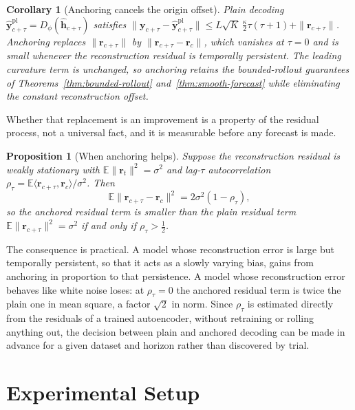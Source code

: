 \documentclass[a4paper,fleqn]{cas-sc}
\newtheorem{proposition}{Proposition}
\newtheorem{corollary}{Corollary}
\newcommand{\h}{\mathbf{h}}
\newcommand{\y}{\mathbf{y}}
\begin{document}
\begin{corollary}[Anchoring cancels the origin offset]
\label{cor:anchor}
Plain decoding $\hat{\y}^{\mathrm{pl}}_{c+\tau}=D_\phi(\hat{\h}_{c+\tau})$ satisfies
$\|\y_{c+\tau}-\hat{\y}^{\mathrm{pl}}_{c+\tau}\|\le
L\sqrt{K}\,\tfrac{\kappa}{2}\tau(\tau+1)+\|\mathbf{r}_{c+\tau}\|$. Anchoring replaces
$\|\mathbf{r}_{c+\tau}\|$ by $\|\mathbf{r}_{c+\tau}-\mathbf{r}_c\|$, which vanishes at
$\tau=0$ and is small whenever the reconstruction residual is temporally
persistent. The leading curvature term is unchanged, so anchoring retains the
bounded-rollout guarantees of Theorems~\ref{thm:bounded-rollout}
and~\ref{thm:smooth-forecast} while eliminating the constant reconstruction
offset.
\end{corollary}

Whether that replacement is an improvement is a property of the residual
process, not a universal fact, and it is measurable before any forecast is
made.

\begin{proposition}[When anchoring helps]
\label{prop:anchor-gain}
Suppose the reconstruction residual is weakly stationary with
$\mathbb{E}\|\mathbf{r}_t\|^2=\sigma^2$ and lag-$\tau$ autocorrelation
$\rho_\tau=\mathbb{E}\langle\mathbf{r}_{c+\tau},\mathbf{r}_c\rangle/\sigma^2$.
Then
\[
    \mathbb{E}\|\mathbf{r}_{c+\tau}-\mathbf{r}_c\|^2
    =
    2\sigma^2(1-\rho_\tau),
\]
so the anchored residual term is smaller than the plain residual term
$\mathbb{E}\|\mathbf{r}_{c+\tau}\|^2=\sigma^2$ if and only if
$\rho_\tau>\tfrac{1}{2}$.
\end{proposition}

The consequence is practical. A model whose reconstruction error is large but
temporally persistent, so that it acts as a slowly varying bias, gains from
anchoring in proportion to that persistence. A model whose reconstruction error
behaves like white noise loses: at $\rho_\tau=0$ the anchored residual term is
twice the plain one in mean square, a factor $\sqrt{2}$ in norm. Since
$\rho_\tau$ is estimated directly from the residuals of a trained
autoencoder, without retraining or rolling anything out, the decision between
plain and anchored decoding can be made in advance for a given dataset and
horizon rather than discovered by trial.

\section{Experimental Setup}
\label{sec:experimental}
\end{document}
